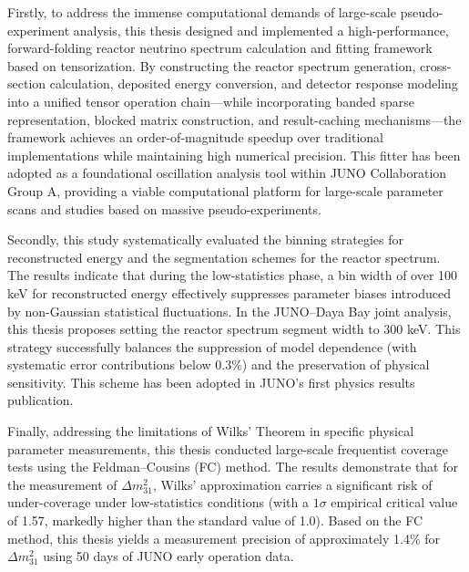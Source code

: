 Firstly, to address the immense computational demands of large-scale pseudo-experiment analysis, this thesis designed and implemented a high-performance, forward-folding reactor neutrino spectrum calculation and fitting framework based on tensorization. By constructing the reactor spectrum generation, cross-section calculation, deposited energy conversion, and detector response modeling into a unified tensor operation chain—while incorporating banded sparse representation, blocked matrix construction, and result-caching mechanisms—the framework achieves an order-of-magnitude speedup over traditional implementations while maintaining high numerical precision. This fitter has been adopted as a foundational oscillation analysis tool within JUNO Collaboration Group A, providing a viable computational platform for large-scale parameter scans and studies based on massive pseudo-experiments.

Secondly, this study systematically evaluated the binning strategies for reconstructed energy and the segmentation schemes for the reactor spectrum. The results indicate that during the low-statistics phase, a bin width of over 100 keV for reconstructed energy effectively suppresses parameter biases introduced by non-Gaussian statistical fluctuations. In the JUNO–Daya Bay joint analysis, this thesis proposes setting the reactor spectrum segment width to 300 keV. This strategy successfully balances the suppression of model dependence (with systematic error contributions below 0.3\%) and the preservation of physical sensitivity. This scheme has been adopted in JUNO’s first physics results publication.

Finally, addressing the limitations of Wilks’ Theorem in specific physical parameter measurements, this thesis conducted large-scale frequentist coverage tests using the Feldman–Cousins (FC) method. The results demonstrate that for the measurement of $\Delta m^2_{31}$, Wilks’ approximation carries a significant risk of under-coverage under low-statistics conditions (with a $1\sigma$ empirical critical value of 1.57, markedly higher than the standard value of 1.0). Based on the FC method, this thesis yields a measurement precision of approximately 1.4\% for $\Delta m^2_{31}$ using 50 days of JUNO early operation data.


\pagestyle{enfrontmatterstyle}%
\cleardoublepage\pagestyle{frontmatterstyle}%


